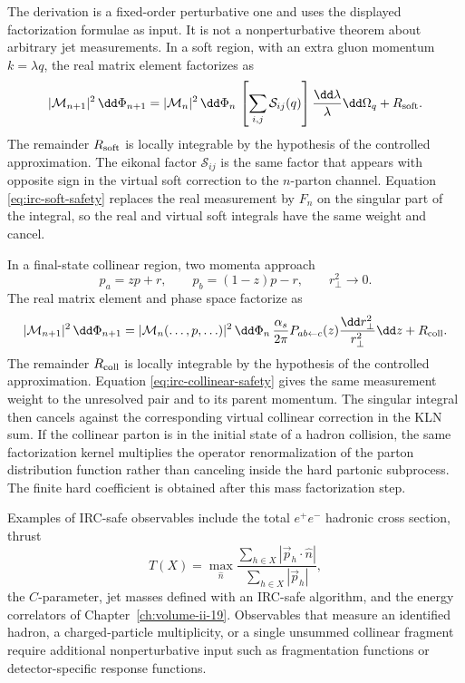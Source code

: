 The derivation is a fixed-order perturbative one and uses the displayed
factorization formulae as input.  It is not a nonperturbative theorem about
arbitrary jet measurements.  In a soft region, with an extra gluon momentum
\(k=\lambda q\), the real matrix element factorizes as
\[
  |\mathcal M_{n+1}|^2\,\dd\Phi_{n+1}
  =
  |\mathcal M_n|^2\,\dd\Phi_n\,
  \left[
    \sum_{i,j}\mathcal S_{ij}(q)
  \right]
  \frac{\dd\lambda}{\lambda}\dd\Omega_q
  +R_{\rm soft}.
\]
The remainder \(R_{\rm soft}\) is locally integrable by the hypothesis of the
controlled approximation.
The eikonal factor \(\mathcal S_{ij}\) is the same factor that appears with
opposite sign in the virtual soft correction to the \(n\)-parton channel.
Equation \eqref{eq:irc-soft-safety} replaces the real measurement by
\(F_n\) on the singular part of the integral, so the real and virtual soft
integrals have the same weight and cancel.

In a final-state collinear region, two momenta approach
\[
  p_a=zp+r,\qquad p_b=(1-z)p-r,
  \qquad r_\perp^2\to0.
\]
The real matrix element and phase space factorize as
\[
  |\mathcal M_{n+1}|^2\,\dd\Phi_{n+1}
  =
  |\mathcal M_n(\ldots,p,\ldots)|^2\,\dd\Phi_n\,
  \frac{\alpha_s}{2\pi}
  P_{a b\leftarrow c}(z)
  \frac{\dd r_\perp^2}{r_\perp^2}\dd z
  +R_{\rm coll}.
\]
The remainder \(R_{\rm coll}\) is locally integrable by the hypothesis of the
controlled approximation.
Equation \eqref{eq:irc-collinear-safety} gives the same measurement weight to
the unresolved pair and to its parent momentum.  The singular integral then
cancels against the corresponding virtual collinear correction in the KLN
sum.  If the collinear parton is in the initial state of a hadron collision,
the same factorization kernel multiplies the operator renormalization of the
parton distribution function rather than canceling inside the hard partonic
subprocess.  The finite hard coefficient is obtained after this mass
factorization step.

Examples of IRC-safe observables include the total \(e^+e^-\) hadronic cross
section, thrust
\[
  T(X)
  =
  \max_{\widehat n}
  \frac{\sum_{h\in X}|\vec p_h\cdot\widehat n|}
       {\sum_{h\in X}|\vec p_h|},
\]
the \(C\)-parameter, jet masses defined with an IRC-safe algorithm, and the
energy correlators of
Chapter~\ref{ch:volume-ii-19}.  Observables that measure an identified
hadron, a charged-particle multiplicity, or a single unsummed collinear
fragment require additional nonperturbative input such as fragmentation
functions or detector-specific response functions.


